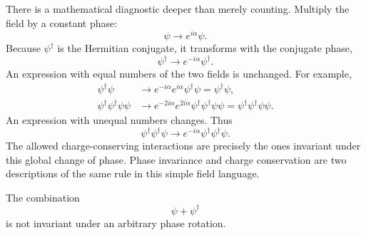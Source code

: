 There is a mathematical diagnostic deeper than merely counting. Multiply the field by a constant phase:
\begin{equation}
\psi\longrightarrow e^{i\alpha}\psi.
\end{equation}
Because \(\psi^\dagger\) is the Hermitian conjugate, it transforms with the conjugate phase,
\begin{equation}
\psi^\dagger\longrightarrow e^{-i\alpha}\psi^\dagger.
\end{equation}
An expression with equal numbers of the two fields is unchanged. For example,
\begin{align}
\psi^\dagger\psi
&\longrightarrow
e^{-i\alpha}e^{i\alpha}\psi^\dagger\psi
=\psi^\dagger\psi,\\
\psi^\dagger\psi^\dagger\psi\psi
&\longrightarrow
e^{-2i\alpha}e^{2i\alpha}
\psi^\dagger\psi^\dagger\psi\psi
=\psi^\dagger\psi^\dagger\psi\psi.
\end{align}
An expression with unequal numbers changes. Thus
\begin{equation}
\psi^\dagger\psi^\dagger\psi
\longrightarrow
e^{-i\alpha}\psi^\dagger\psi^\dagger\psi.
\end{equation}
The allowed charge-conserving interactions are precisely the ones invariant under this global change of phase. Phase invariance and charge conservation are two descriptions of the same rule in this simple field language.

The combination
\begin{equation}
\psi+\psi^\dagger
\end{equation}
is not invariant under an arbitrary phase rotation.

\begin{classroomqa}
\end{classroomqa}

\begin{classroomqa}
\end{classroomqa}

